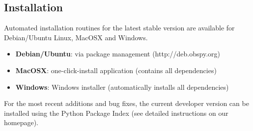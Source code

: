 \documentclass[final]{lmuposter}
\begin{document}
\begin{multicols}{3}
{\section*{Installation}
Automated installation routines for the latest stable version are available for Debian/Ubuntu Linux, MacOSX and Windows.
    \begin{itemize}
    \item \textbf{Debian/Ubuntu}: via package management (http://deb.obspy.org)
    \item \textbf{MacOSX}: one-click-install application (contains all dependencies)
    \item \textbf{Windows}: Windows installer (automatically installs all dependencies)
    \end{itemize}
For the most recent additions and bug fixes, the current developer version can be installed using the Python Package Index (see detailed instructions on our homepage).
}\vspace{0.4\MyBoxVSep}


\columnbreak
\setlength{\MyBoxWidth}{2.08\MyBoxWidth}

\vspace{0.5\MyBoxVSep}


\end{multicols}
\end{document}
